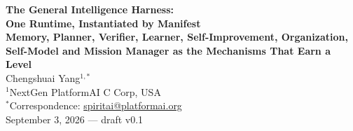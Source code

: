 
\begin{center}
{\LARGE\bfseries The General Intelligence Harness:}\\[6pt]
{\LARGE\bfseries One Runtime, Instantiated by Manifest}\\[8pt]
{\large\bfseries Memory, Planner, Verifier, Learner, Self-Improvement, Organization,\\[2pt]
Self-Model and Mission Manager as the Mechanisms That Earn a Level}\\[16pt]
{\large Chengshuai Yang$^{1,*}$}\\[5pt]
{\normalsize $^{1}$NextGen PlatformAI C Corp, USA}\\[4pt]
{\normalsize $^{*}$Correspondence: \href{mailto:spiritai@platformai.org}{spiritai@platformai.org}}\\[10pt]
{\small September 3, 2026 --- draft v0.1}
\end{center}

